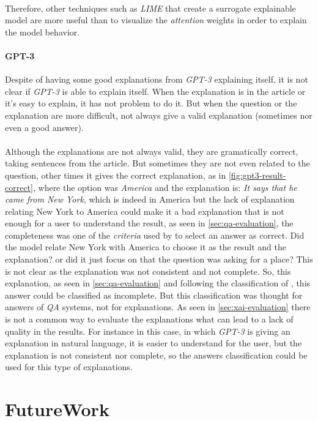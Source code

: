 \paragraph{}
Therefore, other techniques such as \emph{LIME} that create a surrogate explainable model are more useful than to visualize the \emph{attention} weights in order to explain the model behavior.
\paragraph{GPT-3}
Despite of having some good explanations from \emph{GPT-3} explaining itself, it is not clear if \emph{GPT-3} is able to explain itself. When the explanation is in the article or it's easy to explain, it has not problem to do it. But when the question or the explanation are more difficult, not always give a valid explanation (sometimes nor even a good answer).
\paragraph{}
Although the explanations are not always valid, they are gramatically correct, taking sentences from the article. But sometimes they are not even related to the question, other times it gives the correct explanation, as in \ref{fig:gpt3-result-correct}, where the option was \emph{America} and the explanation is: \emph{It says that he came from New York}, which is indeed in America but the lack of explanation relating New York to America could make it a bad explanation that is not enough for a user to understand the result, as seen in \ref{sec:qa-evaluation}, the completeness was one of the \emph{criteria} used by \cite{Allam2012} to select an answer as correct. Did the model relate New York with America to choose it as the result and the explanation? or did it just focus on that the question was asking for a place? This is not clear as the explanation was not consistent and not complete. So, this explanation, as seen in \ref{sec:qa-evaluation} and following the classification of \cite{Pablo-Sanchez}, this answer could be classified as incomplete. But this classification was thought for answers of \emph{QA} systems, not for explanations. As seen in \ref{sec:xai-evaluation} there is not a common way to evaluate the explanations what can lead to a lack of quality in the results. For instance in this case, in which \emph{GPT-3} is giving an explanation in natural language, it is easier to understand for the user, but the explanation is not consistent nor complete, so the answers classification could be used for this type of explanations.
\section{FutureWork}
\label{sec:FutureWork} 